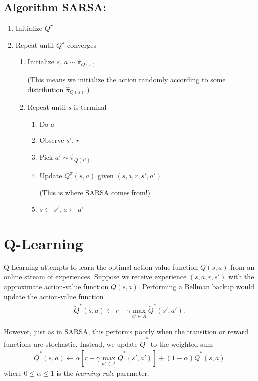 \documentclass[11pt]{article}
\numberwithin{equation}{section}
\numberwithin{figure}{section}
\begin{document}
\subsection*{Algorithm SARSA:}
\begin{enumerate}
	\item Initialize $Q^\pi$
	\item Repeat until $Q^\pi$ converges
	\begin{enumerate}
		\item Initialize $s$, $a \sim \hat{\pi}_{Q(s)}$

		(This means we initialize the action randomly according to some distribution $\hat{\pi}_{Q(s)}$.)
		\item Repeat until $s$ is terminal
		\begin{enumerate}
			\item Do $a$
			\item Observe $s'$, $r$
			\item Pick $a' \sim \hat{\pi}_{Q(s')}$
			\item Update $Q^\pi(s,a)$ given $(s, a, r, s', a')$
			
			(This is where SARSA comes from!)
			\item $s \leftarrow s'$, $a \leftarrow a'$ 
		\end{enumerate}
	\end{enumerate}
\end{enumerate}

\section{Q-Learning}
Q-Learning attempts to learn the optimal action-value function $Q(s, a)$ from
an online stream of experiences. Suppose we receive experience $(s, a, r, s')$
with the approximate action-value function $\tilde{Q}(s, a)$. Performing a
Bellman backup would update the action-value function
\begin{align*}
    \tilde{Q}^*(s, a) \gets r + \gamma \max_{a' \in A} \tilde{Q}^*(s', a').
\end{align*}

However, just as in SARSA, this performs poorly when the transition or reward
functions are stochastic. Instead, we update $\tilde{Q}^*$ to the weighted sum
\begin{align*}
    \tilde{Q}^*(s, a) \gets \alpha \left[r + \gamma \max_{a' \in A} \tilde{Q}^*(s', a')\right]
                            + (1 - \alpha) \tilde{Q}^*(s, a)
\end{align*}
where $0 \le \alpha \le 1$ is the \emph{learning rate} parameter.
\end{document}
